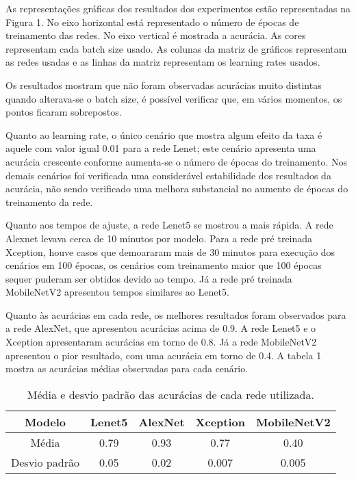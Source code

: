 
As representações gráficas dos resultados dos experimentos estão representadas na Figura 1. No eixo horizontal está representado o número de épocas de treinamento das redes. No eixo vertical é mostrada a acurácia. As cores representam cada batch size usado. As colunas da matriz de gráficos representam as redes usadas e as linhas da matriz representam os learning rates usados.  

Os resultados mostram que não foram observadas acurácias muito distintas quando alterava-se o batch size, é possível verificar que, em vários momentos, os pontos ficaram sobrepostos.

Quanto ao learning rate, o único cenário que mostra algum efeito da taxa é aquele com valor igual 0.01 para a rede Lenet; este cenário apresenta uma acurácia crescente conforme aumenta-se o número de épocas do treinamento. Nos demais cenários foi verificada uma considerável estabilidade dos resultados da acurácia, não sendo verificado uma melhora substancial no aumento de épocas do treinamento da rede.

Quanto aos tempos de ajuste, a rede Lenet5 se mostrou a mais rápida. A rede Alexnet levava cerca de 10 minutos por modelo. Para a rede pré treinada Xception, houve casos que demoararam mais de 30 minutos para execução dos cenários em 100 épocas, os cenários com treinamento maior que 100 épocas sequer puderam ser obtidos devido ao tempo. Já a rede pré treinada MobileNetV2 apresentou tempos similares ao Lenet5.

Quanto às acurácias em cada rede, os melhores resultados foram observados para a rede AlexNet, que apresentou acurácias acima de 0.9. A rede Lenet5 e o Xception apresentaram acurácias em torno de 0.8. Já a rede MobileNetV2 apresentou o pior resultado, com uma acurácia em torno de 0.4. A tabela 1 mostra as acurácias médias observadas para cada cenário. 

\begin{table}[h]
\centering
\begin{tabular}{c|cccc}
\hline
Modelo        & Lenet5 & AlexNet & Xception & MobileNetV2 \\ \hline
Média         & 0.79   & 0.93    & 0.77     & 0.40        \\
Desvio padrão & 0.05   & 0.02    & 0.007    & 0.005       \\ \hline
\end{tabular}
\caption{Média e desvio padrão das acurácias de cada rede utilizada.}
\label{tab:my-table}
\end{table}

